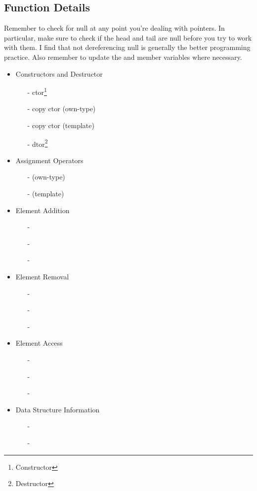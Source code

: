 \subsection{Function Details}


\indent Remember to check for null at any point you're dealing with pointers. In
particular, make sure to check if the head and tail are null before you try
to work with them. I find that not dereferencing null is generally the better
programming practice. Also remember to update the  and  member variables where
necessary.


\begin{itemize}
	\item Constructors and Destructor
	      \begin{itemize}
		      \item[-] ctor\footnote{Constructor}
		      \item[-] copy ctor (own-type)
		      \item[-] copy ctor (template)
		      \item[-] dtor\footnote{Destructor}
	      \end{itemize}
	\item Assignment Operators
	      \begin{itemize}
		      \item[-]  (own-type)
		      \item[-]  (template)
	      \end{itemize}
	\item Element Addition
	      \begin{itemize}
		      \item[-] 
		      \item[-] 
		      \item[-] 
	      \end{itemize}
	\item Element Removal
	      \begin{itemize}
		      \item[-] 
		      \item[-] 
		      \item[-] 
	      \end{itemize}
	\item Element Access
	      \begin{itemize}
		      \item[-] 
		      \item[-] 
		      \item[-] 
	      \end{itemize}
	\item Data Structure Information
	      \begin{itemize}
		      \item[-] 
		      \item[-] 
	      \end{itemize}


\end{itemize}
